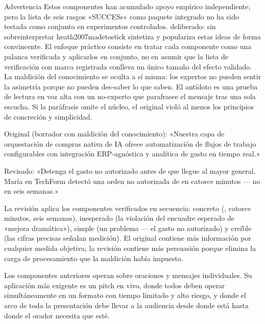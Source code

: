 \begin{admonition}{Advertencia}
Estos componentes han acumulado apoyo empírico independiente, pero la lista de seis rasgos
«SUCCESs» como paquete integrado no ha sido testada como conjunto en experimentos controlados. %
deliberado: sin sobreinterpretar heath2007madetostick
\textcite{heath2007madetostick} sintetiza y populariza estas ideas de forma convincente.
El enfoque práctico consiste en tratar cada componente como una palanca verificada y aplicarlos
en conjunto, no en asumir que la lista de verificación con marca registrada conlleva un único
tamaño del efecto validado. La maldición del conocimiento se oculta a sí misma: los expertos
no pueden sentir la asimetría porque no pueden des-saber lo que saben. El antídoto es una
prueba de lectura en voz alta con un no-experto que parafrasee el mensaje tras una sola
escucha. Si la paráfrasis omite el núcleo, el original violó al menos los principios de
concreción y simplicidad.
\end{admonition}

\begin{example}
Original (borrador con maldición del conocimiento): «Nuestra capa de orquestación de compras
nativa de IA ofrece automatización de flujos de trabajo configurables con integración
ERP-agnóstica y analítica de gasto en tiempo real.»

Revisado: «Detenga el gasto no autorizado antes de que llegue al mayor general. María en
TechForm detectó una orden no autorizada de  en catorce minutos — no en seis
semanas.»

La revisión aplica los componentes verificados en secuencia: concreto (, catorce
minutos, seis semanas), inesperado (la violación del encuadre esperado de «mejora dramática»),
simple (un problema — el gasto no autorizado) y creíble (las cifras precisas señalan medición).
El original contiene más información por cualquier medida objetiva; la revisión contiene más
persuasión porque elimina la carga de procesamiento que la maldición había impuesto.
\end{example}

Los componentes anteriores operan sobre oraciones y mensajes individuales. Su aplicación más
exigente es un pitch en vivo, donde todos deben operar simultáneamente en un formato con tiempo
limitado y alto riesgo, y donde el arco de toda la presentación debe llevar a la audiencia desde
donde está hasta donde el orador necesita que esté.

